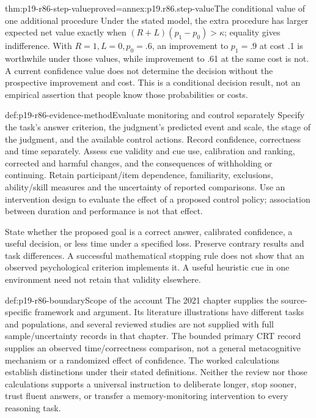\begin{hbtheorem}{thm:p19-r86-step-value}{proved=annex:p19.r86.step-value}{The conditional value of one additional procedure}
Under the stated model, the extra procedure has larger expected net value
exactly when \((R+L)(p_1-p_0)>\kappa\); equality gives indifference.
With \(R=1,L=0,p_0=.6\), an improvement to \(p_1=.9\) at cost .1
is worthwhile under those values, while improvement to .61 at the same cost
is not. A current confidence value does not determine the decision without
the prospective improvement and cost. This is a conditional decision result,
not an empirical assertion that people know those probabilities or costs.
\end{hbtheorem}

\begin{hbmethod}{def:p19-r86-evidence-method}{Evaluate monitoring and control separately}
Specify the task's answer criterion, the judgment's predicted event and scale,
the stage of the judgment, and the available control actions. Record confidence,
correctness and time separately. Assess cue validity and cue use, calibration
and ranking, corrected and harmful changes, and the consequences of withholding
or continuing. Retain participant/item dependence, familiarity, exclusions,
ability/skill measures and the uncertainty of reported comparisons. Use an
intervention design to evaluate the effect of a proposed control policy;
association between duration and performance is not that effect.

State whether the proposed goal is a correct answer, calibrated confidence,
a useful decision, or less time under a specified loss. Preserve contrary
results and task differences. A successful mathematical stopping rule does
not show that an observed psychological criterion implements it. A useful
heuristic cue in one environment need not retain that validity elsewhere.
\end{hbmethod}

\begin{proofboundary}{def:p19-r86-boundary}{Scope of the account}
The 2021 chapter supplies the source-specific framework and argument.
Its literature illustrations have different tasks and populations, and several
reviewed studies are not supplied with full sample/uncertainty records in that
chapter. The bounded primary CRT record supplies an observed time/correctness
comparison, not a general metacognitive mechanism or a randomized effect of
confidence. The worked calculations establish distinctions under their stated
definitions. Neither the review nor those calculations supports a universal
instruction to deliberate longer, stop sooner, trust fluent answers, or transfer
a memory-monitoring intervention to every reasoning task.
\end{proofboundary}
